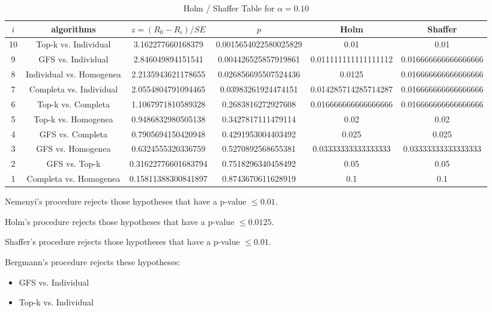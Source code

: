 \documentclass[a4paper,10pt]{article}
\begin{document}
\begin{landscape}
\begin{table}[!htp]
\centering\tiny
\caption{Holm / Shaffer Table for $\alpha=0.10$}
\begin{tabular}{cccccc}
$i$&algorithms&$z=(R_0 - R_i)/SE$&$p$&Holm&Shaffer\\
\hline
10&Top-k vs. Individual&3.162277660168379&0.0015654022580025829&0.01&0.01\\
9&GFS vs. Individual&2.846049894151541&0.004426525857919861&0.011111111111111112&0.016666666666666666\\
8&Individual vs. Homogenea&2.2135943621178655&0.026856695507524436&0.0125&0.016666666666666666\\
7&Completa vs. Individual&2.0554804791094465&0.03983261924474151&0.014285714285714287&0.016666666666666666\\
6&Top-k vs. Completa&1.1067971810589328&0.2683816272927608&0.016666666666666666&0.016666666666666666\\
5&Top-k vs. Homogenea&0.9486832980505138&0.3427817111479114&0.02&0.02\\
4&GFS vs. Completa&0.7905694150420948&0.4291953004403492&0.025&0.025\\
3&GFS vs. Homogenea&0.6324555320336759&0.5270892568655381&0.03333333333333333&0.03333333333333333\\
2&GFS vs. Top-k&0.31622776601683794&0.7518296340458492&0.05&0.05\\
1&Completa vs. Homogenea&0.15811388300841897&0.8743670611628919&0.1&0.1\\
\hline
\end{tabular}
\end{table}
Nemenyi's procedure rejects those hypotheses that have a p-value $\le0.01$.


Holm's procedure rejects those hypotheses that have a p-value $\le0.0125$.


Shaffer's procedure rejects those hypotheses that have a p-value $\le0.01$.


Bergmann's procedure rejects these hypotheses:


\begin{itemize}


\item GFS vs. Individual
\item Top-k vs. Individual
\end{itemize}



\end{landscape}
\end{document}
